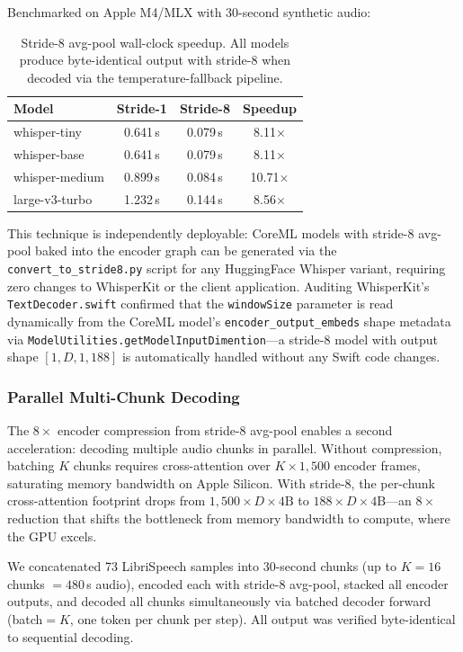 \documentclass[11pt,a4paper]{article}
\begin{document}
Benchmarked on Apple M4/MLX with 30-second synthetic audio:

\begin{table}[H]
\centering
\small
\begin{tabular}{@{}lccc@{}}
\toprule
\textbf{Model} & \textbf{Stride-1} & \textbf{Stride-8} & \textbf{Speedup} \\
\midrule
whisper-tiny & 0.641\,s & 0.079\,s & 8.11$\times$ \\
whisper-base & 0.641\,s & 0.079\,s & 8.11$\times$ \\
whisper-medium & 0.899\,s & 0.084\,s & 10.71$\times$ \\
large-v3-turbo & 1.232\,s & 0.144\,s & 8.56$\times$ \\
\bottomrule
\end{tabular}
\caption{Stride-8 avg-pool wall-clock speedup. All models produce byte-identical output with stride-8 when decoded via the temperature-fallback pipeline.}
\label{tab:stride8}
\end{table}

This technique is independently deployable: CoreML models with stride-8 avg-pool baked into the encoder graph can be generated via the \texttt{convert\_to\_stride8.py} script for any HuggingFace Whisper variant, requiring zero changes to WhisperKit or the client application. Auditing WhisperKit's \texttt{TextDecoder.swift} confirmed that the \texttt{windowSize} parameter is read dynamically from the CoreML model's \texttt{encoder\_output\_embeds} shape metadata via \texttt{ModelUtilities.getModelInputDimention}---a stride-8 model with output shape $[1, D, 1, 188]$ is automatically handled without any Swift code changes.

\subsubsection{Parallel Multi-Chunk Decoding}
\label{sec:parallel}

The $8\times$ encoder compression from stride-8 avg-pool enables a second acceleration: decoding multiple audio chunks in parallel. Without compression, batching $K$ chunks requires cross-attention over $K \times 1{,}500$ encoder frames, saturating memory bandwidth on Apple Silicon. With stride-8, the per-chunk cross-attention footprint drops from $1{,}500 \times D \times 4\text{B}$ to $188 \times D \times 4\text{B}$---an $8\times$ reduction that shifts the bottleneck from memory bandwidth to compute, where the GPU excels.

We concatenated 73 LibriSpeech samples into 30-second chunks (up to $K=16$ chunks $= 480$\,s audio), encoded each with stride-8 avg-pool, stacked all encoder outputs, and decoded all chunks simultaneously via batched decoder forward (batch$=K$, one token per chunk per step). All output was verified byte-identical to sequential decoding.
\end{document}
